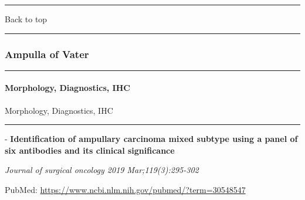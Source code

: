\documentclass[]{article}
\let\oldparagraph\paragraph
\renewcommand{\paragraph}[1]{\oldparagraph{#1}\mbox{}}
\begin{document}
{}

{}

\begin{center}\rule{0.5\linewidth}{\linethickness}\end{center}

Back to top

\begin{center}\rule{0.5\linewidth}{\linethickness}\end{center}

\pagebreak

\hypertarget{ampulla-of-vater}{%
\subsubsection{Ampulla of Vater}\label{ampulla-of-vater}}

\begin{center}\rule{0.5\linewidth}{\linethickness}\end{center}

\hypertarget{morphology-diagnostics-ihc-2}{%
\paragraph{Morphology, Diagnostics,
IHC}\label{morphology-diagnostics-ihc-2}}

Morphology, Diagnostics, IHC

\begin{center}\rule{0.5\linewidth}{\linethickness}\end{center}

 - \textbf{Identification of ampullary carcinoma mixed subtype using a
panel of six antibodies and its clinical significance}

\emph{Journal of surgical oncology 2019 Mar;119(3):295-302}

PubMed: \url{https://www.ncbi.nlm.nih.gov/pubmed/?term=30548547}
\end{document}
